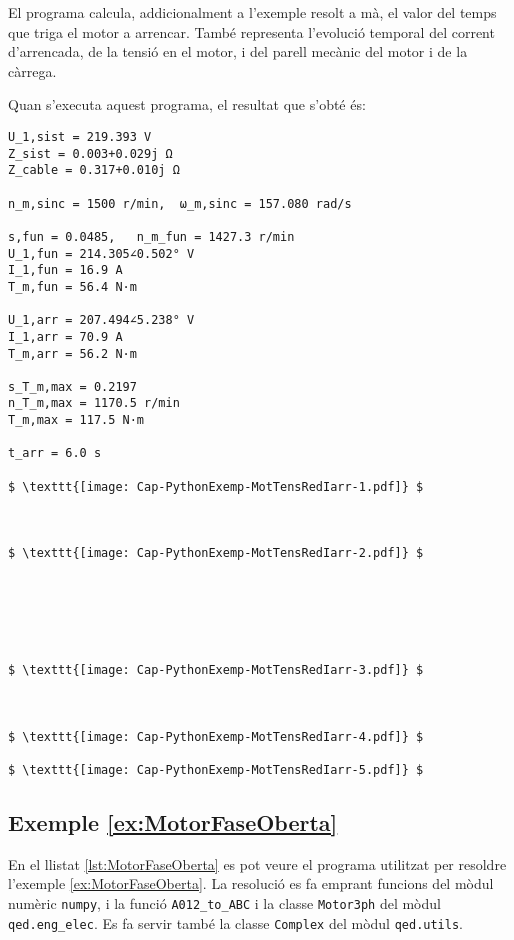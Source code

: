 El programa calcula, addicionalment a l'exemple resolt a mà, el valor  del temps que triga el motor a arrencar. També  representa l'evolució temporal del  corrent d'arrencada, de la tensió en el motor, i del parell mecànic del motor i de la càrrega.

Quan s'executa aquest programa, el resultat que s'obté és:
\lstset{
	language=,
	numbers=none,
	frame=none
}
\begin{lstlisting}[mathescape=true]
U_1,sist = 219.393 V
Z_sist = 0.003+0.029j Ω
Z_cable = 0.317+0.010j Ω

n_m,sinc = 1500 r/min,  ω_m,sinc = 157.080 rad/s

s,fun = 0.0485,   n_m_fun = 1427.3 r/min
U_1,fun = 214.305∠0.502° V
I_1,fun = 16.9 A
T_m,fun = 56.4 N·m

U_1,arr = 207.494∠5.238° V
I_1,arr = 70.9 A
T_m,arr = 56.2 N·m

s_T_m,max = 0.2197
n_T_m,max = 1170.5 r/min
T_m,max = 117.5 N·m

t_arr = 6.0 s

$ \texttt{[image: Cap-PythonExemp-MotTensRedIarr-1.pdf]} $



$ \texttt{[image: Cap-PythonExemp-MotTensRedIarr-2.pdf]} $






$ \texttt{[image: Cap-PythonExemp-MotTensRedIarr-3.pdf]} $



$ \texttt{[image: Cap-PythonExemp-MotTensRedIarr-4.pdf]} $

$ \texttt{[image: Cap-PythonExemp-MotTensRedIarr-5.pdf]} $
\end{lstlisting} 


\hypertarget{exemple:MotorFaseOberta}{\subsection{Exemple \ref*{ex:MotorFaseOberta} \MotorFaseOberta}}
En el llistat \vref{lst:MotorFaseOberta} es pot veure el programa utilitzat per resoldre l'exemple \vref{ex:MotorFaseOberta}. La resolució es fa emprant funcions del mòdul numèric \texttt{numpy}, i la funció \texttt{A012\_to\_ABC} i la classe \texttt{Motor3ph} del mòdul \texttt{qed.eng\_elec}.  Es fa servir també la classe \texttt{Complex} del mòdul \texttt{qed.utils}.



